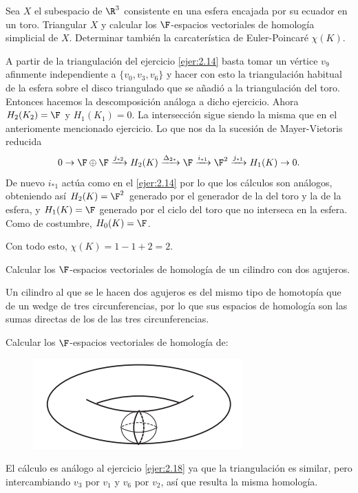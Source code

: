 \documentclass[twoside]{article}
\begin{document}
\newpage

\begin{ejercicio}{2.18}
Sea $X$ el subespacio de $\R^3$
consistente en una esfera encajada por
su ecuador en un toro. Triangular $X$ y calcular los $\F$-espacios vectoriales de homología
simplicial de $X$. Determinar también la carcaterística de Euler-Poincaré $χ(K)$.
\end{ejercicio}
\begin{solucion}
A partir de la triangulación del ejercicio \ref{ejer:2.14} basta tomar un vértice $v_9$ afinmente independiente a $\{v_0,v_3,v_6\}$ y hacer con esto la triangulación habitual de la esfera sobre el disco triangulado que se añadió a la triangulación del toro. Entonces hacemos la descomposición análoga a dicho ejercicio. Ahora $H_2(K_2)=\F$ y $H_1(K_1)=0$. La intersección sigue siendo la misma que en el anteriomente mencionado ejercicio. Lo que nos da la sucesión de Mayer-Vietoris reducida
\[
0\to \F\oplus\F\xrightarrow{j_{*2}}H_2(K)\xrightarrow{\Delta_{2*}}\F\xrightarrow{i_{*1}}\F^2\xrightarrow{j_{*1}}H_1(K)\to 0.
\]
De nuevo $i_{*1}$ actúa como en el \ref{ejer:2.14} por lo que los cálculos son análogos, obteniendo así $H_2(K)=\F^2$ generado por el generador de la del toro y la de la esfera, y $H_1(K)=\F$ generado por el ciclo del toro que no interseca en la esfera. Como de costumbre, $H_0(K)=\F$.

Con todo esto, $\chi(K)=1-1+2=2$.  
\end{solucion}

\newpage

\begin{ejercicio}{2.19}
Calcular los $\F$-espacios vectoriales de homología de un cilindro con dos
agujeros.
\end{ejercicio}
\begin{solucion}
Un cilindro al que se le hacen dos agujeros es del mismo tipo de homotopía que de un wedge de tres circunferencias, por lo que sus espacios de homología son las sumas directas de los de las tres circunferencias. 
\end{solucion}

\newpage

\begin{ejercicio}{2.20}
Calcular los $\F$-espacios vectoriales de homología de:

\begin{figure}[h!]
\centering
\includegraphics[scale=0.7]{toro1}
\end{figure}
\end{ejercicio}
\begin{solucion}
El cálculo es análogo al ejercicio \ref{ejer:2.18} ya que la triangulación es similar, pero intercambiando $v_3$ por $v_1$ y $v_6$ por $v_2$, así que resulta la misma homología. 

\end{solucion}
\end{document}
